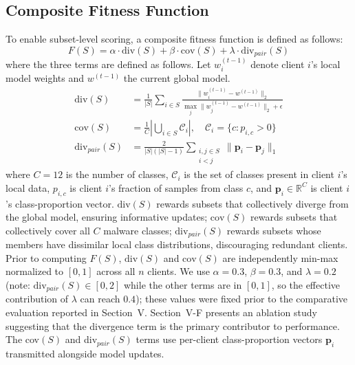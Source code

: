 \documentclass[conference]{IEEEtran}
\begin{document}
\subsection{Composite Fitness Function}
To enable subset-level scoring, a composite fitness function is defined as follows:
\vspace{-4pt}
\begin{equation}
F(S) = \alpha \cdot \text{div}(S) + \beta \cdot \text{cov}(S) + \lambda \cdot \text{div}_{pair}(S)
\end{equation}
\vspace{-6pt}
where the three terms are defined as follows. Let $w_i^{(t-1)}$ denote client $i$'s local model weights and $w^{(t-1)}$ the current global model.
\vspace{-4pt}
\begin{align*}
\text{div}(S) &= \frac{1}{|S|}\sum_{i \in S} \frac{\|w_i^{(t-1)} - w^{(t-1)}\|_2}{\max_j \|w_j^{(t-1)} - w^{(t-1)}\|_2 + \epsilon} \\
\text{cov}(S) &= \frac{1}{C}\left|\bigcup_{i \in S} \mathcal{C}_i\right|, \quad \mathcal{C}_i = \{c : p_{i,c} > 0\} \\
\text{div}_{pair}(S) &= \frac{2}{|S|(|S|-1)}\sum_{\substack{i,j \in S \\ i < j}} \|\mathbf{p}_i - \mathbf{p}_j\|_1
\end{align*}
where $C=12$ is the number of classes, $\mathcal{C}_i$ is the set of classes present in client $i$'s local data, $p_{i,c}$ is client $i$'s fraction of samples from class $c$, and $\mathbf{p}_i \in \mathbb{R}^C$ is client $i$'s class-proportion vector. $\text{div}(S)$ rewards subsets that collectively diverge from the global model, ensuring informative updates; $\text{cov}(S)$ rewards subsets that collectively cover all $C$ malware classes; $\text{div}_{pair}(S)$ rewards subsets whose members have dissimilar local class distributions, discouraging redundant clients. Prior to computing $F(S)$, $\text{div}(S)$ and $\text{cov}(S)$ are independently min-max normalized to $[0,1]$ across all $n$ clients. We use $\alpha=0.3$, $\beta=0.3$, and $\lambda=0.2$ (note: $\text{div}_{pair}(S)\in[0,2]$ while the other terms are in $[0,1]$, so the effective contribution of $\lambda$ can reach $0.4$); these values were fixed prior to the comparative evaluation reported in Section~V. Section~V-F presents an ablation study suggesting that the divergence term is the primary contributor to performance. The cov$(S)$ and div$_{pair}(S)$ terms use per-client class-proportion vectors $\mathbf{p}_i$ transmitted alongside model updates.
\end{document}
